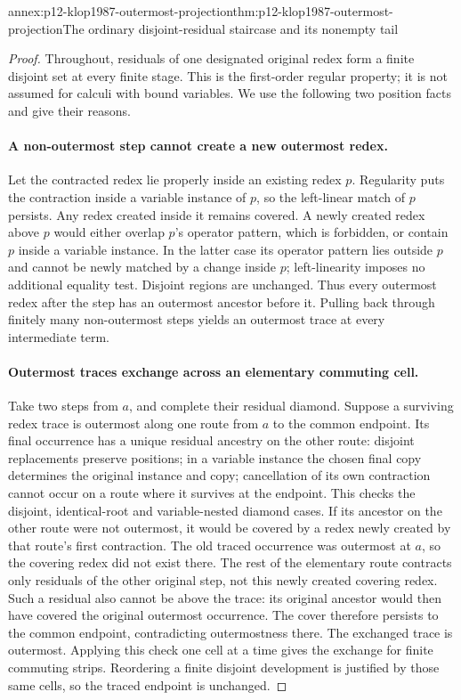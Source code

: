 \begin{annexitem}{annex:p12-klop1987-outermost-projection}{thm:p12-klop1987-outermost-projection}{The ordinary disjoint-residual staircase and its nonempty tail}
\begin{proof}
Throughout, residuals of one designated original redex form a finite
disjoint set at every finite stage. This is the first-order regular
property; it is not assumed for calculi with bound variables.
We use the following two position facts and give their reasons.

\paragraph{A non-outermost step cannot create a new outermost redex.}
Let the contracted redex lie properly inside an existing redex \(p\).
Regularity puts the contraction inside a variable instance of \(p\),
so the left-linear match of \(p\) persists. Any redex created inside
it remains covered. A newly created redex above \(p\) would either
overlap \(p\)'s operator pattern, which is forbidden, or contain
\(p\) inside a variable instance. In the latter case its operator
pattern lies outside \(p\) and cannot be newly matched by a change
inside \(p\); left-linearity imposes no additional equality test.
Disjoint regions are unchanged. Thus every outermost redex after the
step has an outermost ancestor before it. Pulling back through finitely
many non-outermost steps yields an outermost trace at every intermediate
term.

\paragraph{Outermost traces exchange across an elementary commuting cell.}
Take two steps from \(a\), and complete their residual diamond.
Suppose a surviving redex trace is outermost along one route from
\(a\) to the common endpoint. Its final occurrence has a unique
residual ancestry on the other route: disjoint replacements preserve
positions; in a variable instance the chosen final copy determines the
original instance and copy; cancellation of its own contraction cannot
occur on a route where it survives at the endpoint. This checks the
disjoint, identical-root and variable-nested diamond cases.
If its ancestor on the other route were not outermost, it would be
covered by a redex newly created by that route's first contraction.
The old traced occurrence was outermost at \(a\), so the covering
redex did not exist there. The rest of the elementary route contracts
only residuals of the other original step, not this newly created
covering redex. Such a residual also cannot be above the trace: its
original ancestor would then have covered the original outermost
occurrence. The cover therefore persists to the common endpoint,
contradicting outermostness there. The exchanged trace is outermost.
Applying this check one cell at a time gives the exchange for finite
commuting strips. Reordering a finite disjoint development is justified
by those same cells, so the traced endpoint is unchanged.


\end{proof}
\end{annexitem}
